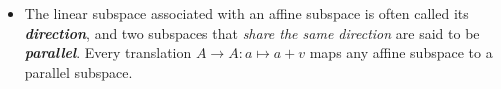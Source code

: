 \documentclass[11pt]{article}
\begin{document}
\begin{itemize}
 \item The linear subspace associated with an affine subspace is often called its \emph{\textbf{direction}}, and two subspaces that \emph{share the same direction} are said to be \emph{\textbf{parallel}}. Every translation $A\to A: a\mapsto a+v$  maps any affine subspace to a parallel subspace.
 



\end{itemize}
\end{document}
